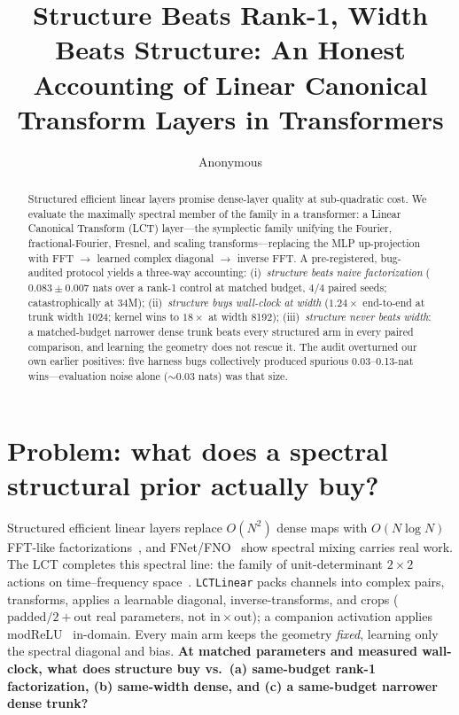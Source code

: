 \documentclass{article}
\title{Structure Beats Rank-1, Width Beats Structure: An Honest Accounting of Linear Canonical Transform Layers in Transformers}
\author{Anonymous}
\begin{document}
\maketitle

\begin{abstract}
Structured efficient linear layers promise dense-layer quality at sub-quadratic cost. We evaluate
the maximally spectral member of the family in a transformer: a Linear Canonical Transform (LCT)
layer---the symplectic family unifying the Fourier, fractional-Fourier, Fresnel, and scaling
transforms---replacing the MLP up-projection with FFT $\to$ learned complex diagonal $\to$
inverse FFT. A pre-registered, bug-audited protocol yields a three-way accounting: (i)~\emph{structure beats naive factorization} ($0.083 \pm 0.007$ nats
over a rank-1 control at matched budget, 4/4 paired seeds; catastrophically at 34M);
(ii)~\emph{structure buys wall-clock at width} ($1.24\times$ end-to-end at trunk width 1024;
kernel wins to $18\times$ at width 8192); (iii)~\emph{structure never beats width}: a matched-budget narrower
dense trunk beats every structured arm in every paired comparison, and learning the geometry does
not rescue it. The audit overturned our own earlier positives: five harness bugs collectively
produced spurious 0.03--0.13-nat wins---evaluation noise alone ($\sim$0.03 nats) was that size.
\end{abstract}

\section{Problem: what does a spectral structural prior actually buy?}

Structured efficient linear layers replace $O(N^2)$ dense maps with $O(N \log N)$ FFT-like
factorizations~\cite{moczulski2016acdc,dao2019butterfly,dao2022monarch}, and
FNet/FNO~\cite{leethorp2021fnet,li2020fno} show spectral mixing carries real work. The LCT completes this spectral line: the family of unit-determinant
$2\times 2$ actions on time--frequency space~\cite{ozaktas2001}. \texttt{LCTLinear} packs
channels into complex pairs, transforms, applies a learnable diagonal, inverse-transforms, and
crops ($\mathrm{padded}/2 + \mathrm{out}$ real parameters, not
$\mathrm{in}\times\mathrm{out}$); a companion activation applies
modReLU~\cite{arjovsky2016unitary} in-domain. Every main arm keeps the geometry
\emph{fixed}, learning only the spectral diagonal and bias. \textbf{At matched parameters and
measured wall-clock, what does structure buy vs.\ (a) same-budget rank-1 factorization,
(b) same-width dense, and (c) a same-budget narrower dense trunk?}
\end{document}
